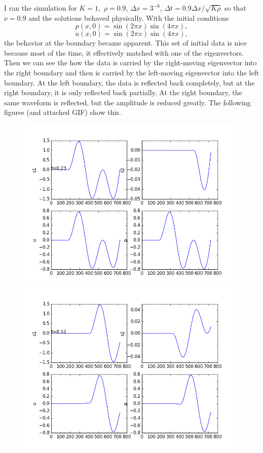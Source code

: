 \documentclass[12pt]{article}
\begin{document}
\begin{enumerate}[(a)]
I ran the simulation for $K=1,$ $\rho=0.9$, $\Delta x = 3^{-6}$, $\Delta t = 0.9 \Delta x / \sqrt{K \rho}$ so that $\nu = 0.9$ and the solutions behaved physically. With the initial conditions $$p(x,0) = \sin(2\pi x)\sin(4 \pi x),$$
$$u(x,0) = \sin(2\pi x)\sin(4 \pi x),$$
the behavior at the boundary became apparent.  This set of initial data is nice because most of the time, it effectively matched with one of the eigenvectors.  Then we can see the how the data is carried by the right-moving eigenvector into the right boundary and then is carried by the left-moving eigenvector into the left boundary.  At the left boundary, the data is reflected back completely, but at the right boundary, it is only reflected back partially.  At the right boundary, the same waveform is reflected, but the amplitude is reduced greatly.  The following figures (and attached GIF) show this.
\begin{figure}[H]
\centering\includegraphics[scale=0.4]{acoustic_eqn_frames/acoustic_eqn_fig05.png}
\centering\includegraphics[scale=0.4]{acoustic_eqn_frames/acoustic_eqn_fig10.png}

\end{figure}
\end{enumerate}
\end{document}
